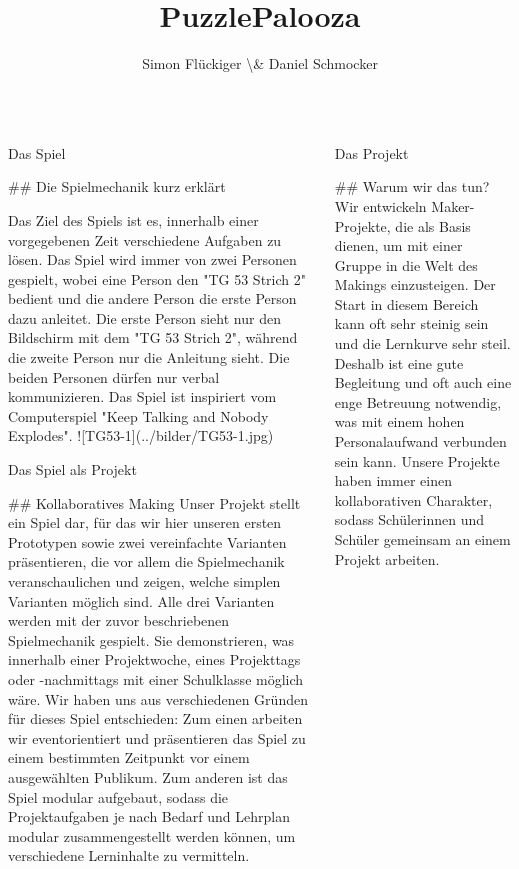 \documentclass{beamer}%
\title{PuzzlePalooza}%
\author[info@swissmakers.ch]{Simon Flückiger \textbackslash{}\& Daniel Schmocker}%
\institute{Swiss Makers}%
\begin{document}
%
\normalsize%
\begin{columns}[T]%
\begin{column}{.32\textwidth}%
\begin{block}{Das Spiel}%
\begin{markdown}
## Die Spielmechanik kurz erklärt

Das Ziel des Spiels ist es, innerhalb einer vorgegebenen Zeit verschiedene Aufgaben zu lösen. Das Spiel wird immer von zwei Personen gespielt, wobei eine Person den "TG 53 Strich 2" bedient und die andere Person die erste Person dazu anleitet. Die erste Person sieht nur den Bildschirm mit dem "TG 53 Strich 2", während die zweite Person nur die Anleitung sieht. Die beiden Personen dürfen nur verbal kommunizieren. Das Spiel ist inspiriert vom Computerspiel "Keep Talking and Nobody Explodes".
![TG53-1](../bilder/TG53-1.jpg)
\end{markdown}%
\end{block}%
\begin{block}{Das Spiel als Projekt}%
\begin{markdown}
## Kollaboratives Making
Unser Projekt stellt ein Spiel dar, für das wir hier unseren ersten Prototypen sowie zwei vereinfachte Varianten präsentieren, die vor allem die Spielmechanik veranschaulichen und zeigen, welche simplen Varianten möglich sind. Alle drei Varianten werden mit der zuvor beschriebenen Spielmechanik gespielt. Sie demonstrieren, was innerhalb einer Projektwoche, eines Projekttags oder -nachmittags mit einer Schulklasse möglich wäre. Wir haben uns aus verschiedenen Gründen für dieses Spiel entschieden: Zum einen arbeiten wir eventorientiert und präsentieren das Spiel zu einem bestimmten Zeitpunkt vor einem ausgewählten Publikum. Zum anderen ist das Spiel modular aufgebaut, sodass die Projektaufgaben je nach Bedarf und Lehrplan modular zusammengestellt werden können, um verschiedene Lerninhalte zu vermitteln.
\end{markdown}%
\end{block}%
\end{column}%
\begin{column}{.32\textwidth}%
\begin{block}{Das Projekt}%
\begin{markdown}
## Warum wir das tun?
Wir entwickeln Maker-Projekte, die als Basis dienen, um mit einer Gruppe in die Welt des Makings einzusteigen. Der Start in diesem Bereich kann oft sehr steinig sein und die Lernkurve sehr steil. Deshalb ist eine gute Begleitung und oft auch eine enge Betreuung notwendig, was mit einem hohen Personalaufwand verbunden sein kann. Unsere Projekte haben immer einen kollaborativen Charakter, sodass Schülerinnen und Schüler gemeinsam an einem Projekt arbeiten.

\end{markdown}
\end{block}
\end{column}
\end{columns}
\end{document}
